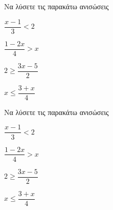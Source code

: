 Να λύσετε τις παρακάτω ανισώσεις
\begin{alist}
\item $ \dfrac{x-1}{3}<2 $
\item $ \dfrac{1-2x}{4}>x $
\item $ 2\geq\dfrac{3x-5}{2} $
\item $ x\leq\dfrac{3+x}{4} $
\end{alist}
Να λύσετε τις παρακάτω ανισώσεις
\begin{alist}
\item $ \dfrac{x-1}{3}<2 $
\item $ \dfrac{1-2x}{4}>x $
\item $ 2\geq\dfrac{3x-5}{2} $
\item $ x\leq\dfrac{3+x}{4} $
\end{alist}
